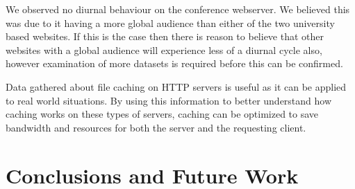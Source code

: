 \documentclass[10pt,conference]{IEEEtran}
\begin{document}
We observed no diurnal behaviour on the conference webserver. We believed this was due to it having a more global audience than either of the two university based websites. If this is the case then there is reason to believe that other websites with a global audience will experience less of a diurnal cycle also, however examination of more datasets is required before this can be confirmed.

Data gathered about file caching on HTTP servers is useful as it can be applied to real world situations. By using this information to better understand how caching works on these types of servers, caching can be optimized to save bandwidth and resources for both the server and the requesting client.


\section{Conclusions and Future Work}\label{conclusions}



\end{document}
